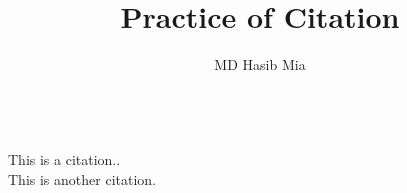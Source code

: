 \documentclass{article}
\title{Practice of Citation}
\author{MD Hasib Mia}
\begin{document}
	\maketitle
	\hline
	\hline
	\\
	This  is a citation.\lipsum[1] \cite{erfani2018impacts}.\\
	
	 This is another citation.\lipsum[1] \cite{mundt2011impact}
	
	

	
	
	
	
	
\end{document}
